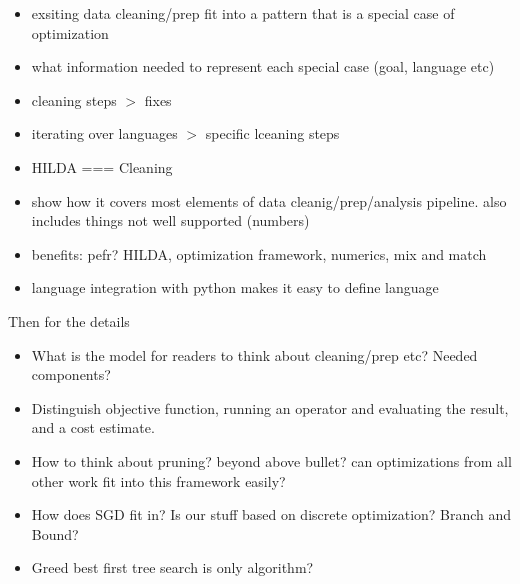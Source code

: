 \begin{itemize}
  \item exsiting data cleaning/prep fit into a pattern that is a special case of optimization
  \item what information needed to represent each special case (goal, language etc)
  \item cleaning steps $>$ fixes
  \item iterating over languages $>$ specific lceaning steps
  \item HILDA === Cleaning
  \item show how it covers most elements of data cleanig/prep/analysis pipeline.  also includes things not well supported (numbers)
  \item benefits: pefr? HILDA, optimization framework, numerics, mix and match
  \item language integration with python makes it easy to define language
\end{itemize}

Then for the details

\begin{itemize}
  \item What is the model for readers to think about cleaning/prep etc?  Needed components?
  \item Distinguish objective function, running an operator and evaluating the result, and a cost estimate.
  \item How to think about pruning? beyond above bullet?  can optimizations from all other work fit into this framework easily?
  \item How does SGD fit in?  Is our stuff based on discrete optimization?  Branch and Bound?
  \item Greed best first tree search is only algorithm?  

\end{itemize}
\fi











